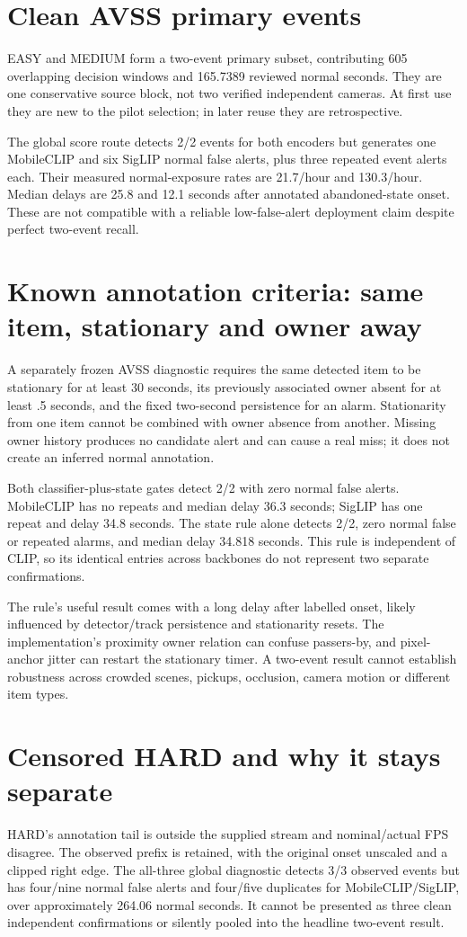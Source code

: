 \section{Clean AVSS primary events}
EASY and MEDIUM form a two-event primary subset, contributing 605 overlapping decision windows and 165.7389 reviewed normal seconds. They are one conservative source block, not two verified independent cameras. At first use they are new to the pilot selection; in later reuse they are retrospective.

The global score route detects 2/2 events for both encoders but generates one MobileCLIP and six SigLIP normal false alerts, plus three repeated event alerts each. Their measured normal-exposure rates are 21.7/hour and 130.3/hour. Median delays are 25.8 and 12.1 seconds after annotated abandoned-state onset. These are not compatible with a reliable low-false-alert deployment claim despite perfect two-event recall.

\section{Known annotation criteria: same item, stationary and owner away}
A separately frozen AVSS diagnostic requires the same detected item to be stationary for at least 30 seconds, its previously associated owner absent for at least .5 seconds, and the fixed two-second persistence for an alarm. Stationarity from one item cannot be combined with owner absence from another. Missing owner history produces no candidate alert and can cause a real miss; it does not create an inferred normal annotation.

Both classifier-plus-state gates detect 2/2 with zero normal false alerts. MobileCLIP has no repeats and median delay 36.3 seconds; SigLIP has one repeat and delay 34.8 seconds. The state rule alone detects 2/2, zero normal false or repeated alarms, and median delay 34.818 seconds. This rule is independent of CLIP, so its identical entries across backbones do not represent two separate confirmations.

The rule's useful result comes with a long delay after labelled onset, likely influenced by detector/track persistence and stationarity resets. The implementation's proximity owner relation can confuse passers-by, and pixel-anchor jitter can restart the stationary timer. A two-event result cannot establish robustness across crowded scenes, pickups, occlusion, camera motion or different item types.

\section{Censored HARD and why it stays separate}
HARD's annotation tail is outside the supplied stream and nominal/actual FPS disagree. The observed prefix is retained, with the original onset unscaled and a clipped right edge. The all-three global diagnostic detects 3/3 observed events but has four/nine normal false alerts and four/five duplicates for MobileCLIP/SigLIP, over approximately 264.06 normal seconds. It cannot be presented as three clean independent confirmations or silently pooled into the headline two-event result.

